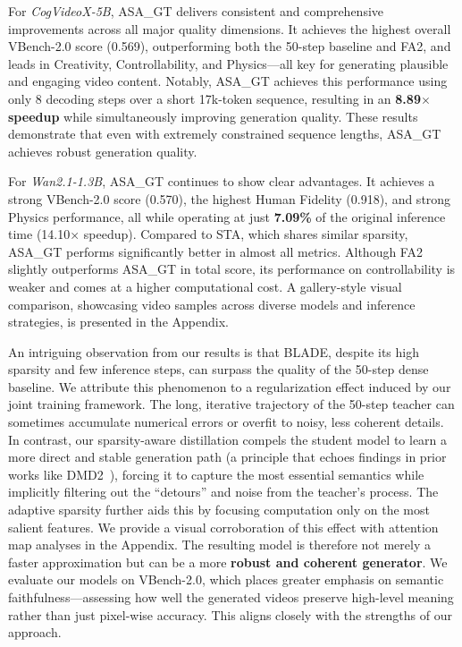 \documentclass[letterpaper]{article} %
\begin{document}
For \textit{CogVideoX-5B}, ASA\_GT delivers consistent and comprehensive improvements across all major quality dimensions. It achieves the highest overall VBench-2.0 score (0.569), outperforming both the 50-step baseline and FA2, and leads in Creativity, Controllability, and Physics—all key for generating plausible and engaging video content. Notably, ASA\_GT achieves this performance using only 8 decoding steps over a short 17k-token sequence, resulting in an \textbf{8.89$\times$ speedup} while simultaneously improving generation quality. These results demonstrate that even with extremely constrained sequence lengths, ASA\_GT achieves robust generation quality.

For \textit{Wan2.1-1.3B}, ASA\_GT continues to show clear advantages. It achieves a strong VBench-2.0 score (0.570), the highest Human Fidelity (0.918), and strong Physics performance, all while operating at just \textbf{7.09\%} of the original inference time (14.10× speedup). Compared to STA, which shares similar sparsity, ASA\_GT performs significantly better in almost all metrics. Although FA2 slightly outperforms ASA\_GT in total score, its performance on controllability is weaker and comes at a higher computational cost. A gallery-style visual comparison, showcasing video samples across diverse models and inference strategies, is presented in the Appendix.

An intriguing observation from our results is that BLADE, despite its high sparsity and few inference steps, can surpass the quality of the 50-step dense baseline. We attribute this phenomenon to a regularization effect induced by our joint training framework. The long, iterative trajectory of the 50-step teacher can sometimes accumulate numerical errors or overfit to noisy, less coherent details. In contrast, our sparsity-aware distillation compels the student model to learn a more direct and stable generation path (a principle that echoes findings in prior works like DMD2~\cite{yin2024improved}), forcing it to capture the most essential semantics while implicitly filtering out the ``detours'' and noise from the teacher's process. The adaptive sparsity further aids this by focusing computation only on the most salient features. We provide a visual corroboration of this effect with attention map analyses in the Appendix. The resulting model is therefore not merely a faster approximation but can be a more \textbf{robust and coherent generator}. We evaluate our models on VBench-2.0, which places greater emphasis on semantic faithfulness—assessing how well the generated videos preserve high-level meaning rather than just pixel-wise accuracy. This aligns closely with the strengths of our approach.
\end{document}

